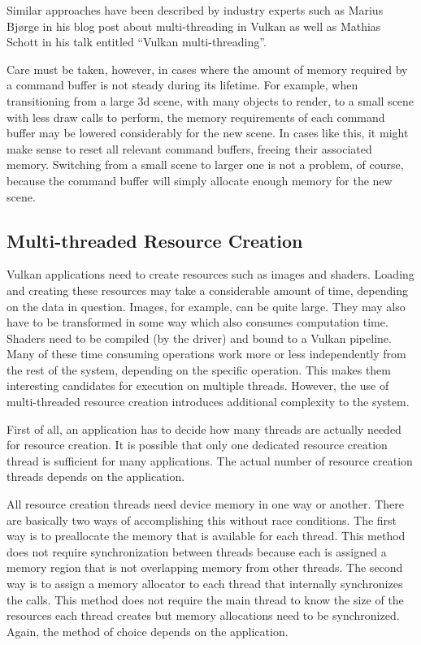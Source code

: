         Similar approaches have been described by industry experts such as Marius Bjørge\cite{bjorge:multithreadingvulkan} in his blog post about multi-threading in Vulkan as well as Mathias Schott\cite{mschott:vulkan_multi_threading} in his talk entitled ``Vulkan multi-threading''.

        Care must be taken, however, in cases where the amount of memory required by a command buffer is not steady during its lifetime.
        For example, when transitioning from a large \gls{3d} scene, with many objects to render, to a small scene with less draw calls to perform, the memory requirements of each command buffer may be lowered considerably for the new scene.
        In cases like this, it might make sense to reset all relevant command buffers, freeing their associated memory.
        Switching from a small scene to larger one is not a problem, of course, because the command buffer will simply allocate enough memory for the new scene.


    \subsection{Multi-threaded Resource Creation}
      Vulkan applications need to create resources such as images and shaders.
      Loading and creating these resources may take a considerable amount of time, depending on the data in question.
      Images, for example, can be quite large.
      They may also have to be transformed in some way which also consumes computation time.
      Shaders need to be compiled (by the \gls{driver}) and bound to a Vulkan pipeline.
      Many of these time consuming operations work more or less independently from the rest of the system, depending on the specific operation.
      This makes them interesting candidates for execution on multiple threads.
      However, the use of multi-threaded resource creation introduces additional complexity to the system.

      First of all, an application has to decide how many threads are actually needed for resource creation.
      It is possible that only one dedicated resource creation thread is sufficient for many applications.
      The actual number of resource creation threads depends on the application.

      All resource creation threads need device memory in one way or another.
      There are basically two ways of accomplishing this without race conditions.
      The first way is to preallocate the memory that is available for each thread.
      This method does not require synchronization between threads because each is assigned a memory region that is not overlapping memory from other threads.
      The second way is to assign a memory allocator to each thread that internally synchronizes the calls.
      This method does not require the main thread to know the size of the resources each thread creates but memory allocations need to be synchronized.
      Again, the method of choice depends on the application.
